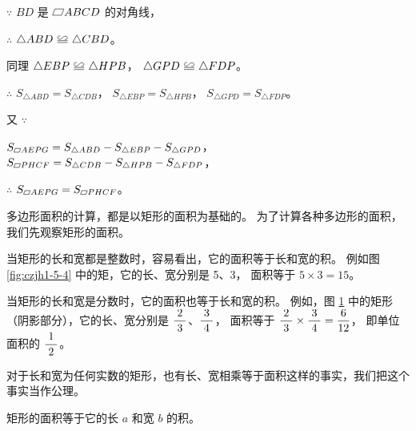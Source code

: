 \zhengming $\because$ \quad $BD$ 是 $\pxsbx ABCD$ 的对角线，

$\therefore$ \quad $\triangle ABD \quandeng \triangle CBD$。

同理 \quad $\triangle EBP \quandeng \triangle HPB$， $\triangle GPD \quandeng \triangle FDP$。

$\therefore$ \quad $S_{\triangle ABD} = S_{\triangle CDB}$，
                   $S_{\triangle EBP} = S_{\triangle HPB}$，
                   $S_{\triangle GPD} = S_{\triangle FDP}$。

又 $\because$ \quad \begin{zmtblr}[t]{}
    $S_{\pxsbx AEPG} = S_{\triangle ABD} - S_{\triangle EBP} - S_{\triangle GPD}$， \\
    $S_{\pxsbx PHCF} = S_{\triangle CDB} - S_{\triangle HPB} - S_{\triangle FDP}$， \\
\end{zmtblr}

$\therefore$ \quad $S_{\pxsbx AEPG} = S_{\pxsbx PHCF}$。

多边形面积的计算，都是以矩形的面积为基础的。
为了计算各种多边形的面积，我们先观察矩形的面积。

当矩形的长和宽都是整数时，容易看出，它的面积等于长和宽的积。
例如图 \ref{fig:czjh1-5-4} 中的矩，它的长、宽分别是 5、3， 面积等于 $5 \times 3 = 15$。

\begin{figure}[htbp]
    \centering
    \begin{minipage}[b]{7cm}
        \centering
        
        \caption{}\label{fig:czjh1-5-4}
    \end{minipage}
    \qquad
    \begin{minipage}[b]{7cm}
        \centering
        
        \caption{}\label{fig:czjh1-5-5}
    \end{minipage}
\end{figure}

\begin{enhancedline}
当矩形的长和宽是分数时，它的面积也等于长和宽的积。
例如，图 \ref{fig:czjh1-5-5} 中的矩形（阴影部分），它的长、宽分别是 $\dfrac{\; 2 \;}{3}$、$\dfrac{\; 3 \;}{4}$，
面积等于 $\dfrac{\; 2 \;}{3} \times \dfrac{\; 3 \;}{4} = \dfrac{6}{12}$，
即单位面积的 $\dfrac{\; 1 \;}{2}$。

对于长和宽为任何实数的矩形，也有长、宽相乘等于面积这样的事实，我们把这个事实当作公理。
\end{enhancedline}

\begin{gongli}[公理]
    矩形的面积等于它的长 $a$ 和宽 $b$ 的积。
\end{gongli}
\begin{center}
\end{center}


